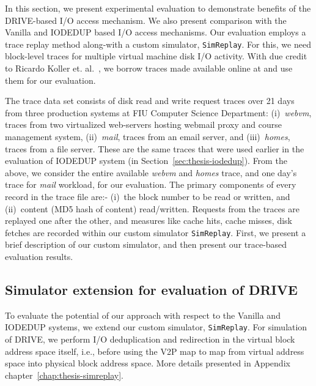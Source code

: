 

In this section, we present experimental evaluation to demonstrate benefits
of the DRIVE-based I/O access mechanism. We also present comparison with
the Vanilla and IODEDUP based I/O access mechanisms. Our evaluation
employs a trace replay method along-with a custom simulator, \texttt{SimReplay}.
For this, we need block-level traces for multiple virtual 
machine disk I/O activity. With due credit to Ricardo Koller 
et. al.~\cite{iodedup, iodedup-online},
we borrow traces made available online at \cite{iodedup-online}
and use them for our evaluation. 

The trace data set consists of
disk read and write request traces over 21 days from three production systems
at FIU Computer Science Department:
(i)~\textit{webvm}, traces from two virtualized web-servers hosting webmail
proxy and course management system, (ii)~\textit{mail}, traces from an
email server, and (iii)~\textit{homes}, traces from a file server.
These are the same traces that were
used earlier in the evaluation of IODEDUP system (in Section~\ref{sec:thesis-iodedup}).
From the above, we consider the entire available \textit{webvm}
and \textit{homes} trace, and one day's trace for \textit{mail} workload,
for our evaluation. 
The primary components of every record in the trace file are:-
(i)~the block number to be read or written, and 
(ii)~content (MD5 hash of content) read/written.
Requests from the traces are replayed one after the other, and 
measures like cache hits, cache misses, disk fetches are recorded within
our custom simulator \texttt{SimReplay}. 
First, we present a brief description of our custom simulator, 
and then present our trace-based evaluation results.

\subsection{Simulator extension for evaluation of DRIVE}
To evaluate the potential of our approach with respect to the Vanilla
and IODEDUP systems, we extend our custom simulator, \texttt{SimReplay}.
For simulation of DRIVE, we perform I/O deduplication and redirection
in the virtual block address space itself, i.e., before using the V2P
map to map from virtual address space into physical block address space.
More details presented in Appendix chapter~\ref{chap:thesis-simreplay}.

